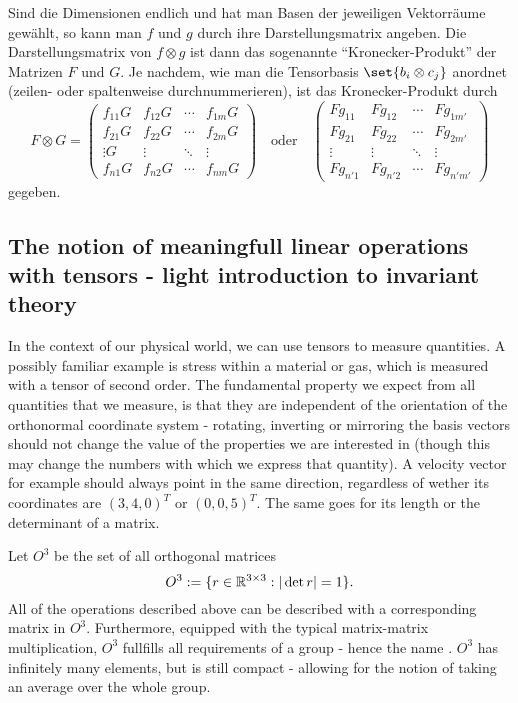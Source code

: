 {\begin{remark}
Sind die Dimensionen endlich und hat man Basen der jeweiligen Vektorräume gewählt, so kann man $f$ und $g$ durch ihre Darstellungsmatrix angeben. Die Darstellungsmatrix von $f\otimes g$ ist dann das sogenannte \enquote{Kronecker-Produkt} der Matrizen $F$ und $G$. Je nachdem, wie man die Tensorbasis $\set{b_i\otimes c_j}$ anordnet (zeilen- oder spaltenweise durchnummerieren), ist das Kronecker-Produkt durch
\[F\otimes G = \begin{pmatrix}
f_{11} G & f_{12} G & \cdots & f_{1m} G \\
f_{21} G & f_{22} G & \cdots & f_{2m} G \\
\vdots G &  \vdots  & \ddots & \vdots   \\
f_{n1} G & f_{n2} G & \cdots & f_{nm} G
\end{pmatrix} \quad\text{oder}\quad \begin{pmatrix}
F g_{11} & F g_{12} & \cdots & F g_{1m'} \\
F g_{21} & F g_{22} & \cdots & F g_{2m'} \\
  \vdots &   \vdots & \ddots &   \vdots  \\
F g_{n'1} & F g_{n'2} & \cdots & F g_{n'm'}
\end{pmatrix}\]
gegeben.
\end{remark}

\subsection{The notion of meaningfull linear operations with tensors - light introduction to invariant theory}
In the context of our physical world, we can use tensors to measure quantities. A possibly familiar example is stress within a material or gas, which is measured with a tensor of second order. 
The fundamental property we expect from all quantities that we measure, is that they are independent of the orientation of the orthonormal coordinate system - rotating, inverting or mirroring the basis vectors should not change the value of the properties we are interested in (though this may change the numbers with which we express that quantity).
A velocity vector for example should always point in the same direction, regardless of wether its coordinates are $(3,4,0)^T$ or $(0,0,5)^T$. The same goes for its length or the determinant of a matrix.

\begin{definition}
	Let $O^3$ be the set of all orthogonal matrices \[O^3:=\{r\in\mathbb{R}^{3\times 3}: |\det{r}| = 1 \}.\] 
	All of the operations described above can be described with a corresponding matrix in $O^3$. Furthermore, equipped with the typical matrix-matrix multiplication, $O^3$ fullfills all requirements of a group - hence the name . $O^3$ has infinitely many elements, but is still compact - allowing for the notion of taking an average over the whole group.
\end{definition}

}
